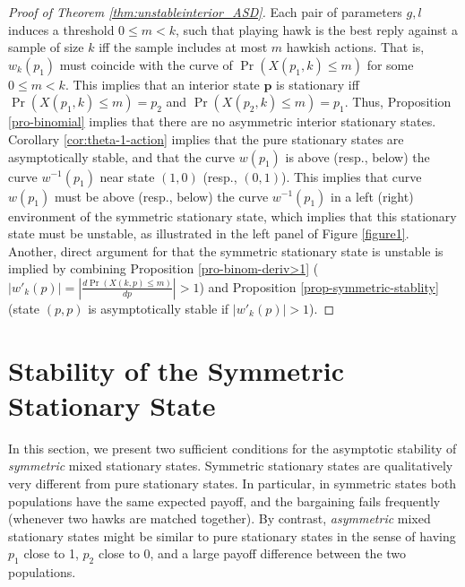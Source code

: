 \documentclass[12pt]{article}
\numberwithin{equation}{section}
\numberwithin{figure}{section}
\theoremstyle{definition}
\theoremstyle{plain}
\theoremstyle{plain}
\theoremstyle{plain}
\theoremstyle{remark}
\theoremstyle{plain}
\theoremstyle{plain}
\begin{document}
\begin {proof}[Proof of Theorem \ref{thm:unstableinterior_ASD}] Each pair of parameters $g,l$ induces a threshold $0 \leq m < k$, such that playing hawk is the best reply against a sample of size $k$ iff the sample includes at most $m$ hawkish actions. That is, $w_k(p_1)$ must coincide with the curve of $\Pr\left(X(p_1,k)\leq m\right)$ for some $0 \leq m < k$.
This implies that an interior state $\textbf{p}$ is stationary iff $\Pr\left(X(p_1,k)\leq m\right)=p_2$ and $\Pr\left(X(p_2,k)\leq m\right)=p_1.$ Thus, Proposition \ref{pro-binomial} implies that there are no asymmetric interior stationary states. Corollary \ref{cor:theta-1-action} implies that the pure stationary states are asymptotically stable, and that the curve  $w(p_1)$ is above (resp., below) the curve $w^{-1}(p_1)$ near state $(1,0)$ (resp., $(0,1)$). This implies that curve $w(p_1)$ must be above (resp., below) the curve $w^{-1}(p_1)$ in a left (right) environment of the symmetric stationary state, which implies that this stationary state must be unstable, as illustrated in the left panel of Figure \ref{figure1}. Another, direct argument for that the symmetric stationary state is unstable is implied by combining Proposition \ref{pro-binom-deriv>1} ($\left|w'_k(p)\right|=\left|\frac{d\Pr\left(X(k,p)\leq m\right)}{dp}\right|>1$) and Proposition \ref{prop-symmetric-stablity} (state $(p,p)$ is asymptotically stable if $|w'_k(p)|>1$).  
\end{proof}


\section{Stability of the Symmetric Stationary State}\label{sec:local stability mixed states}
In this section, we present two sufficient conditions for the asymptotic stability of \emph{symmetric} mixed stationary states. Symmetric stationary states are qualitatively very different 
from pure stationary states. 
In particular, in symmetric states both 
populations have the same expected payoff, and 
the bargaining fails frequently 
(whenever two hawks are matched together). By contrast, \emph{asymmetric} mixed stationary states 
might be 
similar to pure stationary states in the sense of having $p_1$ close to 1, $p_2$ close to 0, and a large payoff difference between the two populations.
\end{document}
